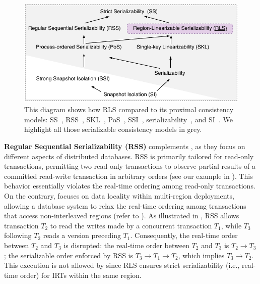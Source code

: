 \begin{figure}[t]  
    \centering
    \includegraphics[width=\columnwidth]{figures/model.pdf}
    \caption{This diagram shows how RLS compared to its proximal consistency models: SS~\cite{papadimitriou1979serializability}, RSS~\cite{rss}, SKL~\cite{taft2020cockroachdb}, PoS~\cite{daudjee2004lazy, lu2016snow}, SSI~\cite{fekete2005making}, serializability~\cite{viotti2016consistency}, and SI~\cite{anderson1998replication}. We highlight all those serializable consistency models in grey.} \label{fig:model}
  \end{figure}

\noindent\textbf{Regular Sequential Serializability (RSS)} complements \xxcons, as they focus on different aspects of distributed databases. RSS is primarily tailored for read-only transactions, permitting two read-only transactions to observe partial results of a committed read-write transaction in arbitrary orders (see our example in ). This behavior essentially violates the real-time ordering among read-only transactions.
On the contrary, \xxcons focuses on data locality within multi-region deployments, allowing a database system to relax the real-time ordering among transactions that access non-interleaved regions (refer to ). 
As illustrated in , RSS allows transaction $T_2$ to read the writes made by a concurrent transaction $T_1$, while $T_3$ following $T_2$ reads a version preceding $T_1$. Consequently, the real-time order between $T_2$ and $T_3$ is disrupted: the real-time order between $T_2$ and $T_3$ is $T_2 \rightarrow T_3$; the serializable order enforced by RSS is $T_3 \rightarrow T_1 \rightarrow T_2$, which implies $T_3 \rightarrow T_2$.
This execution is not allowed by \xxcons since RLS ensures strict serializability (i.e., real-time order) for IRTs within the same region. 

